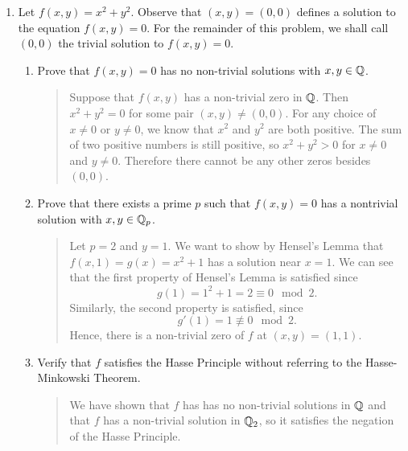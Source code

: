 \documentclass{hw}
\begin{document}
\begin{enumerate}
	\item Let $f(x,y)=x^2 + y^2$. Observe that $(x,y)=(0,0)$ defines a solution to the equation $f(x,y)=0$. For the remainder of this problem, we shall call $(0,0)$ the trivial solution to $f(x,y)=0$.
	      \begin{enumerate}
	      	\item Prove that $f(x,y)=0$ has no non-trivial solutions with $x,y\in\mathbb{Q}$.
	      	      \begin{quote}
	      	      	Suppose that $f(x,y)$ has a non-trivial zero in $\mathbb{Q}$. Then $x^{2}+y^{2} = 0$ for some pair $(x,y)\neq(0,0)$. For any choice of $x\neq0$ or $y\neq0$, we know that $x^{2}$ and $y^{2}$ are both positive. The sum of two positive numbers is still positive, so $x^{2}+y^{2} > 0$ for $x\neq0$ and $y\neq0$. Therefore there cannot be any other zeros besides $(0,0)$.
	      	      \end{quote}
	      	\item Prove that there exists a prime $p$ such that $f(x,y)=0$ has a nontrivial solution with $x,y\in\mathbb{Q}_{p}$.
	      	      \begin{quote}
	      	      	Let $p=2$ and $y=1$. We want to show by Hensel's Lemma that $f(x,1)=g(x)=x^{2}+1$ has a solution near $x=1$. We can see that the first property of Hensel's Lemma is satisfied since
	      	      	\[
	      	      		g(1)=1^{2}+1=2\equiv0\mod2.
	      	      	\]
	      	      	Similarly, the second property is satisfied, since
	      	      	\[
	      	      		g'(1)=1 \not\equiv 0\mod2.
	      	      	\]
	      	      	Hence, there is a non-trivial zero of $f$ at $(x,y)=(1,1)$.
	      	      \end{quote}
	      	\item Verify that $f$ satisfies the Hasse Principle without referring to the Hasse-Minkowski Theorem.
	      	      \begin{quote}
	      	      	We have shown that $f$ has has no non-trivial solutions in $\mathbb{Q}$ and that $f$ has a non-trivial solution in $\mathbb{Q}_{2}$, so it satisfies the negation of the Hasse Principle.
	      	      \end{quote}
	      \end{enumerate}


\end{enumerate}
\end{document}
